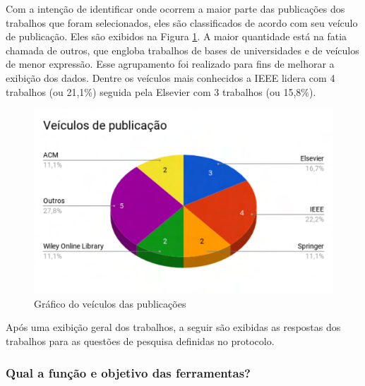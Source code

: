 Com a intenção de identificar onde ocorrem a maior parte das publicações dos trabalhos que foram selecionados, eles são classificados de acordo com seu veículo de publicação. Eles são exibidos na Figura \ref{fig:veiculo}. A maior quantidade está na fatia chamada de outros, que engloba trabalhos de bases de universidades e de veículos de menor expressão. Esse agrupamento foi realizado para fins de melhorar a exibição dos dados. Dentre os veículos mais conhecidos a IEEE lidera com 4 trabalhos (ou 21,1\%) seguida pela Elsevier com 3 trabalhos (ou 15,8\%).

\begin{figure}[!htb]
	\caption{Gráfico do veículos das publicações}\label{fig:veiculo}
	\begin{center}
		\includegraphics[scale=0.6]{img/GrafVeiculo}
	\end{center}
\end{figure}

Após uma exibição geral dos trabalhos, a seguir são exibidas as respostas dos trabalhos para as questões de pesquisa definidas no protocolo.
\subsubsection{Qual a função e objetivo das ferramentas?}\label{subsub:trabalhosRelacionados_resultados_questao1}

